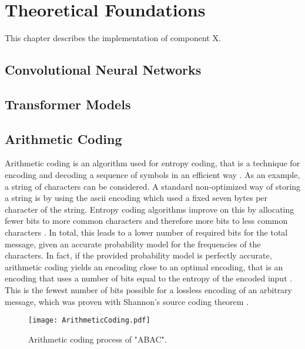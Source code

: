 \chapter{Theoretical Foundations\label{cha:chapter3}}

This chapter describes the implementation of component X.

\section{Convolutional Neural Networks}

\section{Transformer Models}

\section{Arithmetic Coding}
Arithmetic coding is an algorithm used for entropy coding, that is a technique for encoding and decoding a sequence of symbols in an efficient way \citep{witten_arithmetic_1987}. As an example, a string of characters can be considered. A standard non-optimized way of storing a string is by using the \ac{ascii} encoding which used a fixed seven bytes per character of the string. Entropy coding algorithms improve on this by allocating fewer bits to more common characters and therefore more bits to less common characters \citep{witten_arithmetic_1987}. In total, this leads to a lower number of required bits for the total message, given an accurate probability model for the frequencies of the characters. In fact, if the provided probability model is perfectly accurate, arithmetic coding yields an encoding close to an optimal encoding, that is an encoding that uses a number of bits equal to the entropy of the encoded input \citep{witten_arithmetic_1987}. This is the fewest number of bits possible for a lossless encoding of an arbitrary message, which was proven with Shannon's source coding theorem \citep{shannon_mathematical_1948}\citep{mackay_information_2003}.

\begin{figure}
\centering
\texttt{[image: ArithmeticCoding.pdf]}
\caption{Arithmetic coding process of "ABAC".}
\label{fig:arithmetic}
\end{figure}

